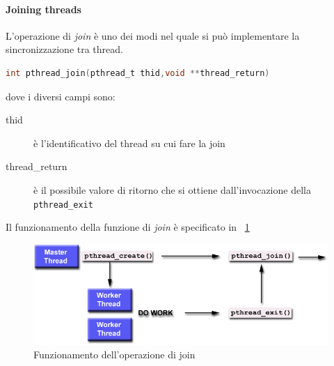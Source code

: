 \paragraph{Joining threads}
L'operazione di \emph{join} è uno dei modi nel quale si può implementare la sincronizzazione tra thread.
\begin{lstlisting}[language=C]
int pthread_join(pthread_t thid,void **thread_return)
\end{lstlisting}
dove i diversi campi sono:
\begin{description}
\item[thid] è l'identificativo del thread su cui fare la join
\item[thread\_return] è il possibile valore di ritorno che si ottiene dall'invocazione della \texttt{pthread\_exit}
\end{description}
Il funzionamento della funzione di \emph{join} è specificato in \figurename\, \ref{fig:join}
\begin{figure}[htb]
\centering
\includegraphics[scale=0.7]{img/join.png}
\caption{Funzionamento dell'operazione di join}\label{fig:join}
\end{figure}
